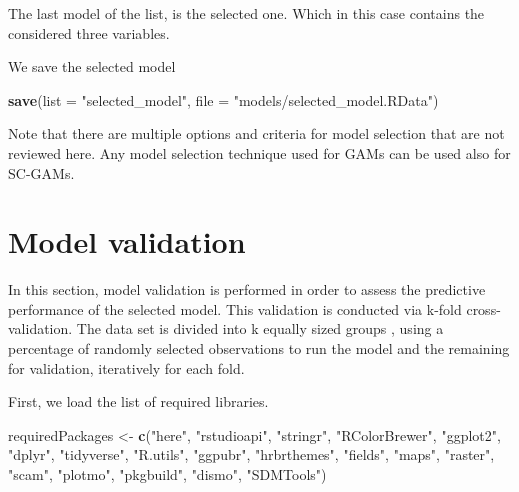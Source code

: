 \documentclass[
]{book}
\newenvironment{Shaded}{\begin{snugshade}}{\end{snugshade}}
\newcommand{\AttributeTok}[1]{\textcolor[rgb]{0.13,0.29,0.53}{#1}}
\newcommand{\FunctionTok}[1]{\textcolor[rgb]{0.13,0.29,0.53}{\textbf{#1}}}
\newcommand{\NormalTok}[1]{#1}
\newcommand{\OtherTok}[1]{\textcolor[rgb]{0.56,0.35,0.01}{#1}}
\newcommand{\SpecialCharTok}[1]{\textcolor[rgb]{0.81,0.36,0.00}{\textbf{#1}}}
\newcommand{\StringTok}[1]{\textcolor[rgb]{0.31,0.60,0.02}{#1}}
\begin{document}
The last model of the list, is the selected one. Which in this case contains the considered three variables.

\begin{Shaded}
\end{Shaded}

We save the selected model

\begin{Shaded}
\begin{Highlighting}[]
\FunctionTok{save}\NormalTok{(}\AttributeTok{list =} \StringTok{"selected\_model"}\NormalTok{, }\AttributeTok{file =} \StringTok{"models/selected\_model.RData"}\NormalTok{)}
\end{Highlighting}
\end{Shaded}

Note that there are multiple options and criteria for model selection that are not reviewed here. Any model selection technique used for GAMs can be used also for SC-GAMs.

\chapter{Model validation}\label{model-validation}

In this section, model validation is performed in order to assess the predictive performance of the selected model. This validation is conducted via k-fold cross-validation. The data set is divided into k equally sized groups \citep{hijmans_2012}, using a percentage of randomly selected observations to run the model and the remaining for validation, iteratively for each fold.

First, we load the list of required libraries.

\begin{Shaded}
\begin{Highlighting}[]
\NormalTok{requiredPackages }\OtherTok{\textless{}{-}} \FunctionTok{c}\NormalTok{(}\StringTok{"here"}\NormalTok{, }\StringTok{"rstudioapi"}\NormalTok{,}
    \StringTok{"stringr"}\NormalTok{, }\StringTok{"RColorBrewer"}\NormalTok{, }\StringTok{"ggplot2"}\NormalTok{,}
    \StringTok{"dplyr"}\NormalTok{, }\StringTok{"tidyverse"}\NormalTok{, }\StringTok{"R.utils"}\NormalTok{, }\StringTok{"ggpubr"}\NormalTok{,}
    \StringTok{"hrbrthemes"}\NormalTok{, }\StringTok{"fields"}\NormalTok{, }\StringTok{"maps"}\NormalTok{, }\StringTok{"raster"}\NormalTok{,}
    \StringTok{"scam"}\NormalTok{, }\StringTok{"plotmo"}\NormalTok{, }\StringTok{"pkgbuild"}\NormalTok{, }\StringTok{"dismo"}\NormalTok{,}
    \StringTok{"SDMTools"}\NormalTok{)}
\end{Highlighting}
\end{Shaded}
\end{document}
